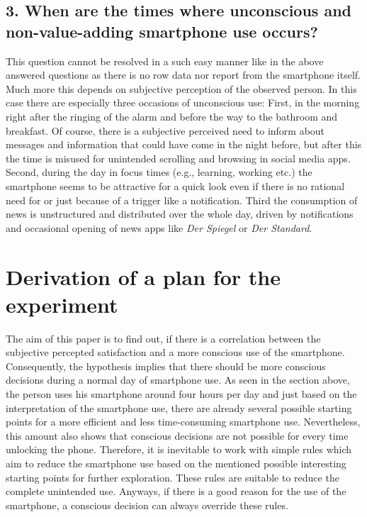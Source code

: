 \documentclass[11pt,a4paper]{article}
\begin{document}
\subsection*{3. When are the times where unconscious and non-value-adding smartphone use occurs?}
This question cannot be resolved in a such easy manner like in the above answered questions as there is no row data nor report from the smartphone itself. Much more this depends on subjective perception of the observed person. In this case there are especially three occasions of unconscious use: First, in the morning right after the ringing of the alarm and before the way to the bathroom and breakfast. Of course, there is a subjective perceived need to inform about messages and information that could have come in the night before, but after this the time is misused for unintended scrolling and browsing in social media apps. Second, during the day in focus times (e.g., learning, working etc.) the smartphone seems to be attractive for a quick look even if there is no rational need for or just because of a trigger like a notification. Third the consumption of news is unstructured and distributed over the whole day, driven by notifications and occasional opening of news apps like \textit{Der Spiegel} or \textit{Der Standard}.

\section*{Derivation of a plan for the experiment}
The aim of this paper is to find out, if there is a correlation between the subjective percepted satisfaction and a more conscious use of the smartphone. Consequently, the hypothesis implies that there should be more conscious decisions during a normal day of smartphone use. As seen in the section above, the person uses his smartphone around four hours per day and just based on the interpretation of the smartphone use, there are already several possible starting points for a more efficient and less time-consuming smartphone use. Nevertheless, this amount also shows that conscious decisions are not possible for every time unlocking the phone. Therefore, it is inevitable to work with simple rules which aim to reduce the smartphone use based on the mentioned possible interesting starting points for further exploration. These rules are suitable to reduce the complete unintended use. Anyways, if there is a good reason for the use of the smartphone, a conscious decision can always override these rules.
\end{document}
